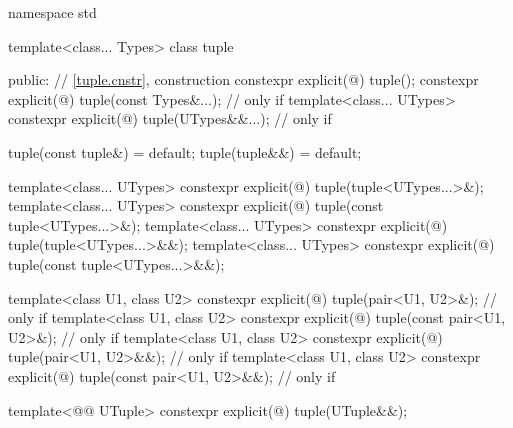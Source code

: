 %
\begin{codeblock}
namespace std {
  template<class... Types>
  class tuple {
  public:
    // \ref{tuple.cnstr},  construction
    constexpr explicit(@\seebelow@) tuple();
    constexpr explicit(@\seebelow@) tuple(const Types&...);         // only if 
    template<class... UTypes>
      constexpr explicit(@\seebelow@) tuple(UTypes&&...);           // only if 

    tuple(const tuple&) = default;
    tuple(tuple&&) = default;

    template<class... UTypes>
      constexpr explicit(@\seebelow@) tuple(tuple<UTypes...>&);
    template<class... UTypes>
      constexpr explicit(@\seebelow@) tuple(const tuple<UTypes...>&);
    template<class... UTypes>
      constexpr explicit(@\seebelow@) tuple(tuple<UTypes...>&&);
    template<class... UTypes>
      constexpr explicit(@\seebelow@) tuple(const tuple<UTypes...>&&);

    template<class U1, class U2>
      constexpr explicit(@\seebelow@) tuple(pair<U1, U2>&);         // only if 
    template<class U1, class U2>
      constexpr explicit(@\seebelow@) tuple(const pair<U1, U2>&);   // only if 
    template<class U1, class U2>
      constexpr explicit(@\seebelow@) tuple(pair<U1, U2>&&);        // only if 
    template<class U1, class U2>
      constexpr explicit(@\seebelow@) tuple(const pair<U1, U2>&&);  // only if 

    template<@@ UTuple>
      constexpr explicit(@\seebelow@) tuple(UTuple&&);

}}
\end{codeblock}
